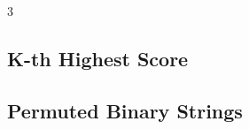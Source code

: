 \documentclass[8pt]{extarticle}
\begin{document}
\begin{multicols*}{3}
\subsection{K-th Highest Score}
\begin{caixaenunciado}

\end{caixaenunciado}
\vspace{0.3cm}


\subsection{Permuted Binary Strings}
\begin{caixaenunciado}

\end{caixaenunciado}
\vspace{0.3cm}

\end{multicols*}
\pagebreak
\end{document}
